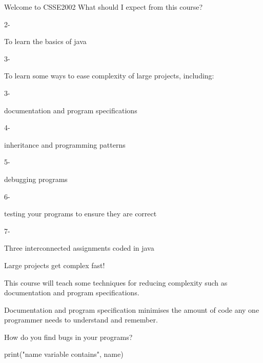 \documentclass[week2]{csse2002}
\begin{document}
\begin{topic}{Welcome to CSSE2002}
What should I expect from this course?

\begin{itemize}
    \begin{subtopic}{2-}
    \item To learn the basics of java
    \end{subtopic}
    \begin{subtopic}{3-}
    \item To learn some ways to ease complexity of large projects, including:
    \end{subtopic}
    \begin{subtopic}{3-}
    \item documentation and program specifications
    \end{subtopic}
    \begin{subtopic}{4-}
    \item inheritance and programming patterns
    \end{subtopic}
    \begin{subtopic}{5-}
    \item debugging programs
    \end{subtopic}
    \begin{subtopic}{6-}
    \item testing your programs to ensure they are correct
    \end{subtopic}
    \begin{subtopic}{7-}
    \item Three interconnected assignments coded in java
    \end{subtopic}
\end{itemize}

\begin{subtopic}{3}
Large projects get complex fast!

This course will teach some techniques for reducing complexity such as documentation and program specifications.

Documentation and program specification minimises the amount of code any one programmer needs to understand and remember.
\end{subtopic}

\begin{subtopic}{5}
How do you find bugs in your programs?

\begin{python}
print("name variable contains", name)
\end{python}


\end{subtopic}
\end{topic}
\end{document}
